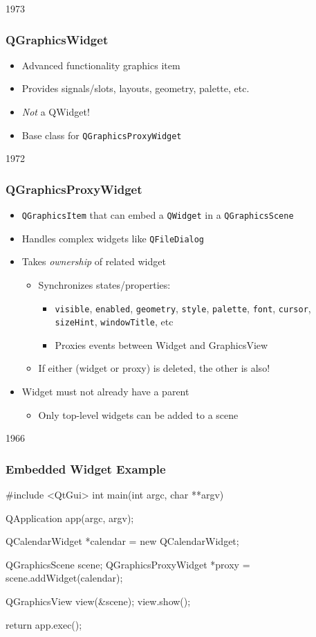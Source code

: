 \begin{slide}{1973}
\frametitle{QGraphicsWidget}
\begin{itemize}
\item Advanced functionality graphics item
\item Provides signals/slots, layouts, geometry, palette, etc.
\item \textit{Not} a QWidget!
\item Base class for \texttt{QGraphicsProxyWidget}
\end{itemize}
\end{slide}


\begin{slide}{1972}
\frametitle{QGraphicsProxyWidget}
\begin{itemize}
\item \texttt{QGraphicsItem} that can embed a \texttt{QWidget} in a \texttt{QGraphicsScene}
\item Handles complex widgets like \texttt{QFileDialog}
\item Takes \textit{ownership} of related widget
    \begin{itemize}
    \item Synchronizes states/properties:
        \begin{itemize}
        \item \texttt{visible}, \texttt{enabled}, \texttt{geometry}, \texttt{style}, \texttt{palette}, \texttt{font}, \texttt{cursor}, \texttt{sizeHint}, \texttt{windowTitle}, etc
        \item Proxies events between Widget and GraphicsView
        \end{itemize}
    \item If either (widget or proxy) is deleted, the other is also!
    \end{itemize}
\item Widget must not already have a parent
    \begin{itemize}
    \item Only top-level widgets can be added to a scene
    \end{itemize}
\end{itemize}
\end{slide}


\begin{slide}[fragile]{1966}


\frametitle{Embedded Widget Example}
\begin{cpp}
#include <QtGui>
int main(int argc, char **argv) {
   QApplication app(argc, argv);

   QCalendarWidget *calendar = new QCalendarWidget;

   QGraphicsScene scene;
   QGraphicsProxyWidget *proxy = scene.addWidget(calendar);

   QGraphicsView view(&scene);
   view.show();

   return app.exec();
}
\end{cpp}
\end{slide}

